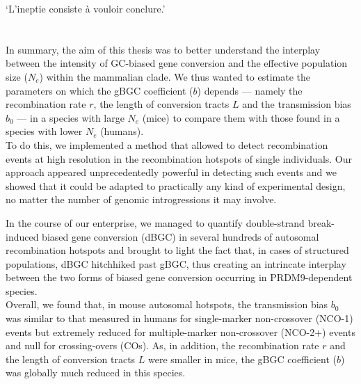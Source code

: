 \begin{savequote}[8cm]

	‘L'ineptie consiste à vouloir conclure.’

\end{savequote}

\chapter*{\label{ch:conclusion}}


In summary, the aim of this thesis was to better understand the interplay between the intensity of GC-biased gene conversion and the effective population size ($N_e$) within the mammalian clade.
We thus wanted to estimate the parameters on which the gBGC coefficient ($b$) depends — namely the recombination rate $r$, the length of conversion tracts $L$ and the transmission bias $b_0$ — in a species with large $N_e$ (mice) to compare them with those found in a species with lower $N_e$ (humans).\\

To do this, we implemented a method that allowed to detect recombination events at high resolution in the recombination hotspots of single individuals.
Our approach appeared unprecedentedly powerful in detecting such events and we showed that it could be adapted to practically any kind of experimental design, no matter the number of genomic introgressions it may involve.

In the course of our enterprise, we managed to quantify double-strand break-induced biased gene conversion (dBGC) in several hundreds of autosomal recombination hotspots and brought to light the fact that, in cases of structured populations, dBGC hitchhiked past gBGC, thus creating an intrincate interplay between the two forms of biased gene conversion occurring in PRDM9-dependent species.\\

Overall, we found that, in mouse autosomal hotspots, the transmission bias $b_0$ was similar to that measured in humans for single-marker non-crossover (NCO-1) events but extremely reduced for multiple-marker non-crossover (NCO-2+) events and null for crossing-overs (COs).
As, in addition, the recombination rate $r$ and the length of conversion tracts $L$ were smaller in mice, the gBGC coefficient ($b$) was globally much reduced in this species.

